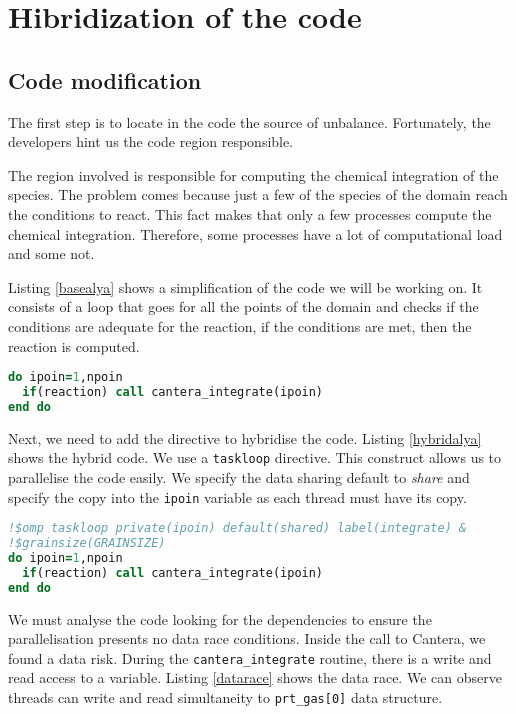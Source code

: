 \section{Hibridization of the code}
\subsection{Code modification}
The first step is to locate in the code the source of unbalance. Fortunately, the developers hint us the code region responsible. 


The region involved is responsible for computing the chemical integration of the species. The problem comes because just a few of the species of the domain reach the conditions to react. This fact makes that only a few processes compute the chemical integration. Therefore, some processes have a lot of computational load and some not. 


Listing \ref{basealya} shows a simplification of the code we will be working on. It consists of a loop that goes for all the points of the domain and checks if the conditions are adequate for the reaction, if the conditions are met, then the reaction is computed. 


\begin{lstlisting}[language=Fortran, caption={Chemical integration base loop.}, label={basealya}]
do ipoin=1,npoin
  if(reaction) call cantera_integrate(ipoin)
end do
\end{lstlisting}


Next, we need to add the directive to hybridise the code. Listing \ref{hybridalya} shows the hybrid code. We use a \texttt{taskloop} directive. This construct allows us to parallelise the code easily. We specify the data sharing default to \textit{share} and specify the copy into the \texttt{ipoin} variable as each thread must have its copy.

\begin{lstlisting}[language=Fortran, caption={Chemical integration hybrid loop.}, label={hybridalya}]
!$omp taskloop private(ipoin) default(shared) label(integrate) &
!$grainsize(GRAINSIZE)
do ipoin=1,npoin
  if(reaction) call cantera_integrate(ipoin)
end do
\end{lstlisting}

We must analyse the code looking for the dependencies to ensure the parallelisation presents no data race conditions. Inside the call to Cantera, we found a data risk. During the \texttt{cantera\_integrate} routine, there is a write and read access to a variable. Listing \ref{datarace} shows the data race. We can observe threads can write and read simultaneity to \texttt{prt\_gas[0]} data structure. 

